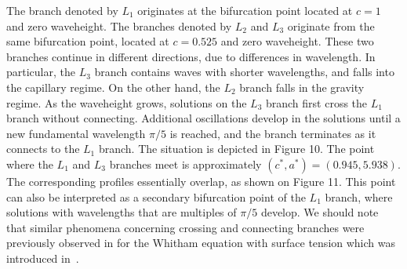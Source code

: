The branch denoted by $L_1$ originates at the bifurcation point 
located at $c = 1$ and zero waveheight.
The branches denoted by $L_2$ and $L_3$ originate from the same bifurcation point,
located at $c = 0.525$ and zero waveheight. 
These two branches continue in different directions, due to differences in wavelength.
In particular, the $L_3$ branch contains waves with shorter wavelengths, and falls into the  
capillary regime. On the other hand, the $L_2$ branch falls in the gravity regime.
As the waveheight grows, solutions on the $L_3$ branch first cross the $L_1$ branch without
connecting. Additional oscillations develop in the solutions until 
a new fundamental wavelength $\pi/5$ is reached, and the branch terminates
as it connects to the $L_1$ branch. The situation is depicted in Figure 10. 
The point where the $L_1$ and $L_3$ branches meet
is approximately $(c^*,a^*) = (0.945, 5.938)$.
The corresponding profiles essentially overlap, as shown on Figure 11.
This point can also be interpreted as a secondary bifurcation point 
of the $L_1$ branch, where solutions with wavelengths that are multiples of $\pi/5$ develop. 
We should note that similar phenomena concerning crossing and connecting
branches were previously observed in \cite{Remonato2016}
for the Whitham equation with surface tension which was introduced in~\cite{Hur2015}. 
	

